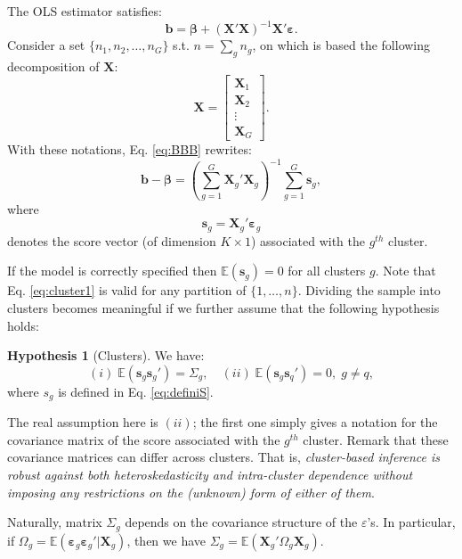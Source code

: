 \documentclass[
  11pt,
]{book}
\theoremstyle{definition}
\theoremstyle{definition}
\theoremstyle{definition}
\theoremstyle{definition}
\newtheorem{hypothesis}{Hypothesis}[chapter]
\theoremstyle{remark}
\begin{document}
The OLS estimator satisfies:
\begin{equation}
\mathbf{b} = \boldsymbol\beta + (\mathbf{X}'\mathbf{X})^{-1}\mathbf{X}'\boldsymbol\varepsilon.\label{eq:BBB}
\end{equation}
Consider a set \(\{n_1,n_2,\dots,n_G\}\) s.t. \(n=\sum_g n_g\), on which is based the following decomposition of \(\mathbf{X}\):
\[
\mathbf{X} = \left[
\begin{array}{c}
\mathbf{X}_1 \\
\mathbf{X}_2 \\
\vdots\\
\mathbf{X}_G
\end{array}
\right].
\]
With these notations, Eq. \eqref{eq:BBB} rewrites:
\begin{equation}
\mathbf{b} - \boldsymbol\beta = \left(\sum_{g=1}^G \mathbf{X}_g'\mathbf{X}_g\right)^{-1}\sum_{g=1}^G \mathbf{s}_g,\label{eq:cluster1}
\end{equation}
where
\begin{equation}
\mathbf{s}_g = \mathbf{X}_g'\boldsymbol\varepsilon_g \label{eq:definiS}
\end{equation}
denotes the score vector (of dimension \(K \times 1\)) associated with the \(g^{th}\) cluster.

If the model is correctly specified then \(\mathbb{E}(\mathbf{s}_g)=0\) for all clusters \(g\). Note that Eq. \eqref{eq:cluster1} is valid for any partition of \(\{1,\dots,n\}\). Dividing the sample into clusters becomes meaningful if we further assume that the following hypothesis holds:

\begin{hypothesis}[Clusters]
\protect\hypertarget{hyp:cluster}{}\label{hyp:cluster}We have:
\[
(i)\; \mathbb{E}(\mathbf{s}_g\mathbf{s}_g')=\Sigma_g,\quad (ii)\; \mathbb{E}(\mathbf{s}_g\mathbf{s}_q')=0,\;g \ne q,
\]
where \(s_g\) is defined in Eq. \eqref{eq:definiS}.
\end{hypothesis}

The real assumption here is \((ii)\); the first one simply gives a notation for the covariance matrix of the score associated with the \(g^{th}\) cluster. Remark that these covariance matrices can differ across clusters. That is, \emph{cluster-based inference is robust against both heteroskedasticity and intra-cluster dependence without imposing any restrictions on the (unknown) form of either of them}.

Naturally, matrix \(\Sigma_g\) depends on the covariance structure of the \(\varepsilon\)'s. In particular, if \(\Omega_g = \mathbb{E}(\boldsymbol\varepsilon_g\boldsymbol\varepsilon_g'|\mathbf{X}_g)\), then we have \(\Sigma_g = \mathbb{E}(\mathbf{X}_g'\Omega_g\mathbf{X}_g)\).
\end{document}
